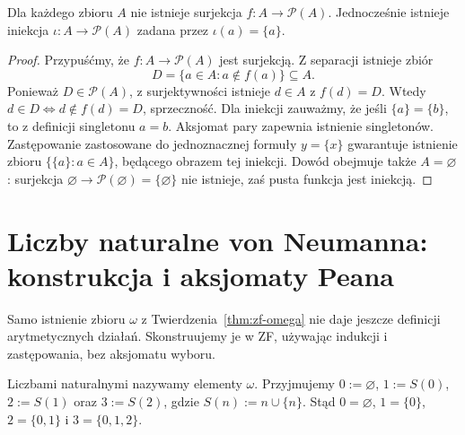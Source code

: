 \begin{twierdzenie}\label{thm:zf-cantor}
Dla każdego zbioru $A$ nie istnieje surjekcja
$f:A\to\mathcal P(A)$. Jednocześnie istnieje iniekcja
$\iota:A\to\mathcal P(A)$ zadana przez $\iota(a)=\{a\}$.
\end{twierdzenie}
\begin{proof}
Przypuśćmy, że $f:A\to\mathcal P(A)$ jest surjekcją.
Z separacji istnieje zbiór
\[
 D=\{a\in A:a\notin f(a)\}\subseteq A.
\]
Ponieważ $D\in\mathcal P(A)$, z surjektywności istnieje
$d\in A$ z $f(d)=D$. Wtedy
$ d\in D\iff d\notin f(d)=D$, sprzeczność.
Dla iniekcji zauważmy, że jeśli $\{a\}=\{b\}$,
to z definicji singletonu $a=b$. Aksjomat pary
zapewnia istnienie singletonów. Zastępowanie zastosowane do
jednoznacznej formuły $y=\{x\}$ gwarantuje istnienie
zbioru $\{\{a\}:a\in A\}$, będącego obrazem tej iniekcji.
Dowód obejmuje także $A=\varnothing$: surjekcja
$\varnothing\to\mathcal P(\varnothing)=\{\varnothing\}$
nie istnieje, zaś pusta funkcja jest iniekcją.
\end{proof}


\section{Liczby naturalne von Neumanna: konstrukcja i aksjomaty Peana}

Samo istnienie zbioru $\omega$ z Twierdzenia~\ref{thm:zf-omega}
nie daje jeszcze definicji arytmetycznych działań.
Skonstruujemy je w ZF, używając indukcji i zastępowania,
bez aksjomatu wyboru.

\begin{definicja}
\label{def:zf-vn-natural}
Liczbami naturalnymi nazywamy elementy $\omega$.
Przyjmujemy $0:=\varnothing$, $1:=S(0)$, $2:=S(1)$
oraz $3:=S(2)$, gdzie $S(n):=n\cup\{n\}$. Stąd
$0=\varnothing$, $1=\{0\}$, $2=\{0,1\}$ i $3=\{0,1,2\}$.
\end{definicja}

